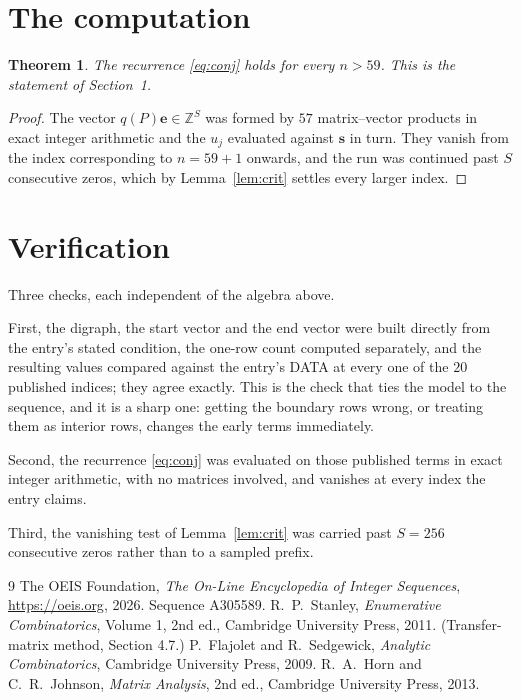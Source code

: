 \documentclass[11pt,a4paper]{article}
\theoremstyle{plain}
\newtheorem{theorem}{Theorem}
\theoremstyle{definition}
\begin{document}
\section{The computation}

\begin{theorem}
The recurrence \eqref{eq:conj} holds for every $n>59$. This is the statement of
Section~1.
\end{theorem}

\begin{proof}
The vector $q(P)\mathbf{e}\in\mathbb{Z}^{S}$ was formed by $57$ matrix--vector
products in exact integer arithmetic and the $u_j$ evaluated against $\mathbf{s}$ in turn.
They vanish from the index corresponding to $n=59+1$ onwards, and the run was continued
past $S$ consecutive zeros, which by Lemma~\ref{lem:crit} settles every larger index.
\end{proof}

\section{Verification}

Three checks, each independent of the algebra above.

First, the digraph, the start vector and the end vector were built directly from the
entry's stated condition, the one-row count computed separately, and the resulting values
compared against the entry's DATA at every one of the $20$ published indices; they
agree exactly. This is the check that ties the model to the sequence, and it is a sharp one:
getting the boundary rows wrong, or treating them as interior rows, changes the early terms
immediately.

Second, the recurrence \eqref{eq:conj} was evaluated on those published terms in exact
integer arithmetic, with no matrices involved, and vanishes at every index the entry claims.

Third, the vanishing test of Lemma~\ref{lem:crit} was carried past $S=256$ consecutive
zeros rather than to a sampled prefix.

\begin{thebibliography}{9}
 The OEIS Foundation, \emph{The On-Line Encyclopedia of Integer
Sequences}, \url{https://oeis.org}, 2026. Sequence A305589.
 R.~P.~Stanley, \emph{Enumerative Combinatorics}, Volume 1, 2nd ed.,
Cambridge University Press, 2011. (Transfer-matrix method, Section 4.7.)
 P.~Flajolet and R.~Sedgewick, \emph{Analytic Combinatorics}, Cambridge
University Press, 2009.
 R.~A.~Horn and C.~R.~Johnson, \emph{Matrix Analysis}, 2nd ed., Cambridge
University Press, 2013.
\end{thebibliography}
\end{document}
